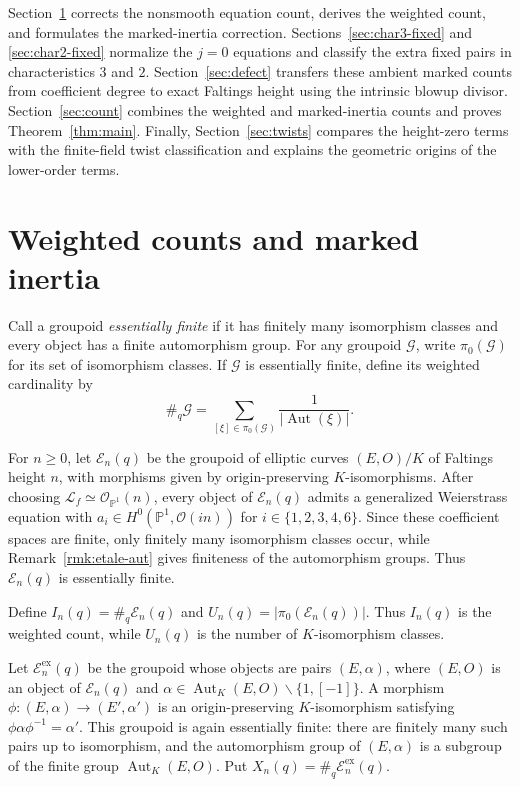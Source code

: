 \documentclass[a4paper,12pt]{amsart}
\theoremstyle{definition}
\newcommand{\cE}{\mathcal E}
\newcommand{\Pb}{\mathbb{P}}
\newcommand{\Aut}{\operatorname{Aut}}
\renewcommand{\setminus}{\smallsetminus}
\begin{document}
Section~\ref{sec:weighted} corrects the nonsmooth equation count, derives the weighted count, and formulates the marked-inertia correction.  Sections~\ref{sec:char3-fixed} and \ref{sec:char2-fixed} normalize the $j=0$ equations and classify the extra fixed pairs in characteristics $3$ and $2$.  Section~\ref{sec:defect} transfers these ambient marked counts from coefficient degree to exact Faltings height using the intrinsic blowup divisor.  Section~\ref{sec:count} combines the weighted and marked-inertia counts and proves Theorem~\ref{thm:main}.  Finally, Section~\ref{sec:twists} compares the height-zero terms with the finite-field twist classification and explains the geometric origins of the lower-order terms.



\section{Weighted counts and marked inertia}\label{sec:weighted}

Call a groupoid \emph{essentially finite} if it has finitely many isomorphism classes and every object has a finite automorphism group.  For any groupoid $\mathcal G$, write $\pi_0(\mathcal G)$ for its set of isomorphism classes.  If $\mathcal G$ is essentially finite, define its weighted cardinality by
\[
\#_q\mathcal G
=
\sum_{[\xi]\in\pi_0(\mathcal G)}
\frac{1}{|\Aut(\xi)|}.
\]

For $n\geq0$, let $\cE_n(q)$ be the groupoid of elliptic curves $(E,O)/K$ of Faltings height $n$, with morphisms given by origin-preserving $K$-isomorphisms.  After choosing $\mathcal L_f\simeq\mathcal O_{\Pb^1}(n)$, every object of $\cE_n(q)$ admits a generalized Weierstrass equation with $a_i\in H^0(\Pb^1,\mathcal O(in))$ for $i\in\{1,2,3,4,6\}$.  Since these coefficient spaces are finite, only finitely many isomorphism classes occur, while Remark~\ref{rmk:etale-aut} gives finiteness of the automorphism groups. Thus $\cE_n(q)$ is essentially finite.

Define $I_n(q)=\#_q\cE_n(q)$ and $U_n(q)=|\pi_0(\cE_n(q))|$.  Thus $I_n(q)$ is the weighted count, while $U_n(q)$ is the number of $K$-isomorphism classes.

Let $\cE_n^{\mathrm{ex}}(q)$ be the groupoid whose objects are pairs $(E,\alpha)$, where $(E,O)$ is an object of $\cE_n(q)$ and $\alpha\in\Aut_K(E,O)\setminus\{1,[-1]\}$.  A morphism $\phi\colon(E,\alpha)\to(E',\alpha')$ is an origin-preserving $K$-isomorphism satisfying $\phi\alpha\phi^{-1}=\alpha'$.  This groupoid is again essentially finite: there are finitely many such pairs up to isomorphism, and the automorphism group of $(E,\alpha)$ is a subgroup of the finite group $\Aut_K(E,O)$.  Put $X_n(q)=\#_q\cE_n^{\mathrm{ex}}(q)$.
\end{document}
